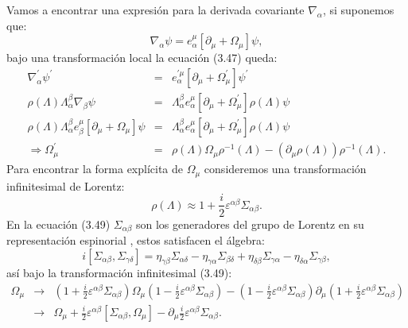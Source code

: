 Vamos a encontrar una expresión para la derivada covariante $\nabla_\alpha$, si suponemos que:
\begin{equation}
\nabla_{\alpha}\psi=e_{\alpha}^{\mu}[\partial_{\mu}+\Omega_{\mu}]\psi ,
\end{equation}
bajo una transformación local la ecuación (3.47) queda:
\begin{eqnarray}
\nonumber \nabla_{\alpha}^{\prime}\psi^{\prime}&=& e_{\alpha}^{\prime\mu}[\partial_{\mu}+\Omega_{\mu}^{\prime}]\psi^{\prime}\\
\nonumber  \rho(\Lambda)\Lambda_{\alpha}^{\beta}\nabla_{\beta}\psi &=&\Lambda_{\alpha}^{\beta}e_{\alpha}^{\mu}[\partial_{\mu}+\Omega_{\mu}^{\prime}]\rho(\Lambda)\psi\\
\nonumber \rho(\Lambda)\Lambda_{\alpha}^{\beta}e_{\beta}^{\mu}[\partial_{\mu}+\Omega_{\mu}]\psi &=& \Lambda_{\alpha}^{\beta}e_{\alpha}^{\mu}[\partial_{\mu}+\Omega_{\mu}^{\prime}]\rho(\Lambda)\psi\\
\Rightarrow\Omega_{\mu}^{\prime}&=&\rho(\Lambda)\Omega_{\mu}\rho^{-1}(\Lambda)-(\partial_{\mu}\rho(\Lambda))\rho^{-1}(\Lambda).
\end{eqnarray}
Para encontrar la forma explícita de $\Omega_\mu$ consideremos una transformación infinitesimal de Lorentz:
\begin{equation}
\rho(\Lambda)\approx1+\frac{i}{2}\varepsilon^{\alpha\beta}\Sigma_{\alpha\beta}.
\end{equation} 
En la ecuación (3.49) $\Sigma_{\alpha\beta}$ son los generadores del grupo de Lorentz en su representación espinorial , estos satisfacen el álgebra:
\begin{equation}
i[\Sigma_{\alpha\beta},\Sigma_{\gamma\delta}]=\eta_{\gamma\beta}\Sigma_{\alpha\delta}-\eta_{\gamma\alpha}\Sigma_{\beta\delta}+\eta_{\delta\beta}\Sigma_{\gamma\alpha}-\eta_{\delta\alpha}\Sigma_{\gamma\beta} ,
\end{equation}
así bajo la transformación infinitesimal (3.49):
\begin{eqnarray}
\nonumber \Omega_{\mu}&\to &\left(1+\frac{i}{2}\varepsilon^{\alpha\beta}\Sigma_{\alpha\beta}\right)\Omega_{\mu}\left(1-\frac{i}{2}\varepsilon^{\alpha\beta}\Sigma_{\alpha\beta}\right)-\left(1-\frac{i}{2}\varepsilon^{\alpha\beta}\Sigma_{\alpha\beta}\right)\partial_{\mu}\left(1+\frac{i}{2}\varepsilon^{\alpha\beta}\Sigma_{\alpha\beta}\right)\\
&\to &\Omega_{\mu}+\frac{i}{2}\varepsilon^{\alpha\beta}[\Sigma_{\alpha\beta},\Omega_{\mu}]-\partial_{\mu}\frac{i}{2}\varepsilon^{\alpha\beta}\Sigma_{\alpha\beta} .
\end{eqnarray}
